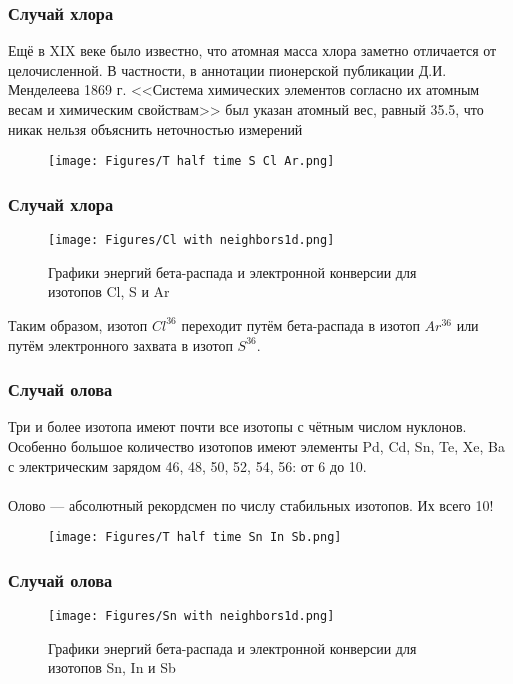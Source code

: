 \begin{frame}
\frametitle{Случай хлора}
{\footnotesize
Ещё в XIX веке было известно, что атомная масса хлора заметно отличается от целочисленной. В частности, в аннотации пионерской публикации Д.И.\,Менделеева 1869 г.
<<Система химических элементов согласно их атомным весам и химическим свойствам>> 
был указан атомный вес, равный 35.5, что никак нельзя объяснить неточностью измерений}
\begin{figure}[ht] 
	\centering\small
	\unitlength=1mm
	\texttt{[image: Figures/T half time S Cl Ar.png]} 
	\label{f:T half time S Cl Ar}
\end{figure}


\end{frame}

\begin{frame}
\frametitle{Случай хлора}
\begin{figure}[ht] 
	\centering\small
	\unitlength=1mm
	\texttt{[image: Figures/Cl with neighbors1d.png]} 
	\caption{Графики энергий бета-распада и электронной конверсии для изотопов Cl, S  и Ar}%
	\label{f:Cl with neighbors1d}
\end{figure}
Таким образом, изотоп $Cl^{36}$ переходит путём бета-распада в изотоп  $Ar^{36}$ или путём электронного захвата в изотоп  $S^{36}$.

\end{frame}

\begin{frame}
\frametitle{Случай олова}
Три и более изотопа имеют почти все изотопы с чётным числом нуклонов.  
~\\
Особенно большое количество изотопов имеют элементы Pd, Cd, Sn, Te, Xe, Ba с электрическим зарядом  46, 48, 50, 52, 54, 56:
от 6 до 10.\\
~\\
Олово --- абсолютный рекордсмен по числу стабильных изотопов. Их всего 10!

\begin{figure}[ht] 
	\centering\small
	\unitlength=1mm
	\texttt{[image: Figures/T half time Sn In Sb.png]} 
	\label{f:T half time Sn In Sb}
\end{figure}
\end{frame}

\begin{frame}
\frametitle{Случай олова}
\begin{figure}[ht] 
	\centering\small
	\unitlength=1mm
	\texttt{[image: Figures/Sn with neighbors1d.png]} 
	\caption{Графики энергий бета-распада и электронной конверсии для изотопов Sn, In  и Sb} %
	\label{f:Sn with neighbors1d}
\end{figure}
\end{frame}

